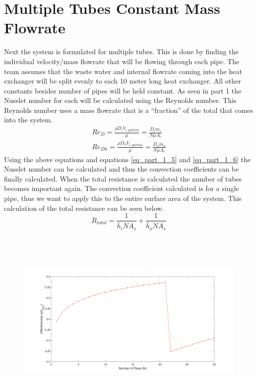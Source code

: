 \section{Multiple Tubes Constant Mass Flowrate}
Next the system is formulated for multiple tubes. This is done by finding the individual velocity/mass flowrate that will be flowing through each pipe. The team assumes that the waste water and internal flowrate coming into the heat exchanger will be split evenly to each 10 meter long heat exchanger. All other constants besides number of pipes will be held constant. As seen in part 1 the Nusslet number for each will be calculated using the Reynolds number. This Reynolds number uses a mass flowrate that is a ``fraction'' of the total that comes into the system.
\begin{subequations}
\begin{eqnarray}
 { Re }_{ D } =\frac { \rho { D }_{ i }{ V }_{ i,partial } }{ \mu  } =\frac { { D }_{ i }{ \dot { m }  }_{ i } }{ N\mu { A }_{ c } } \\ 
 { Re }_{ Dh } =\frac { \rho { D }_{ h }{ V }_{ i,partial } }{ \mu  } =\frac { { D }_{ h }{ \dot { m }  }_{ o } }{ N\mu { A }_{ c } } 
\end{eqnarray}
\end{subequations}
%
Using the above equations and equations \eqref{eq_part_1_5} and \eqref{eq_part_1_6} the Nusslet number can be calculated and thus the convection coefficients can be finally calculated. When the total resistance is calculated the number of tubes becomes important again. The convection coefficient calculated is for a single pipe, thus we want to apply this to the entire surface area of the system. This calculation of the total resistance can be seen below.
%
\begin{equation}
    { R }_{ total }=\frac { 1 }{ { \bar { h }  }_{ i }N{ A }_{ s } } +\frac { 1 }{ { \bar { h }  }_{ o }N{ A }_{ s } } 
\end{equation}
%
\begin{figure}[H]
    \centering
    \includegraphics[height=3.5in]{pictures/part_2_2m2_effectiveness.png}
\end{figure}
